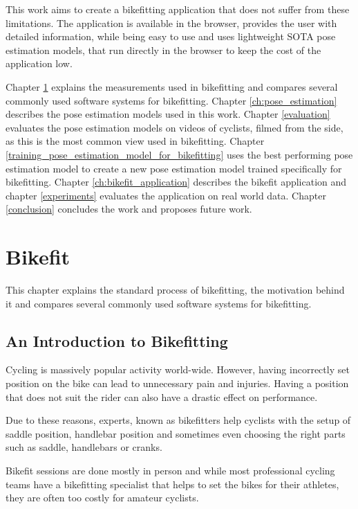 This work aims to create a bikefitting application that does not suffer from these limitations. The application is available in the browser, provides the user with detailed information, while being easy to use and uses lightweight SOTA pose estimation models, that run directly in the browser to keep the cost of the application low.

Chapter \ref{bikefit} explains the measurements used in bikefitting and compares several commonly used software systems for bikefitting. Chapter \ref{ch:pose_estimation} describes the pose estimation models used in this work. Chapter \ref{evaluation} evaluates the pose estimation models on videos of cyclists, filmed from the side, as this is the most common view used in bikefitting. Chapter \ref{training_pose_estimation_model_for_bikefitting} uses the best performing pose estimation model to create a new pose estimation model trained specifically for bikefitting. Chapter \ref{ch:bikefit_application} describes the bikefit application and chapter \ref{experiments} evaluates the application on real world data. Chapter \ref{conclusion} concludes the work and proposes future work.


\chapter{Bikefit}
\label{bikefit}
This chapter explains the standard process of bikefitting, the motivation behind it and compares several commonly used software systems for bikefitting.

\section{An Introduction to Bikefitting}
Cycling is massively popular activity world-wide. However, having incorrectly set position on the bike can lead to unnecessary pain and injuries. Having a position that does not suit the rider can also have a drastic effect on performance.

Due to these reasons, experts, known as bikefitters help cyclists with the setup of saddle position, handlebar position and sometimes even choosing the right parts such as saddle, handlebars or cranks.

Bikefit sessions are done mostly in person and while most professional cycling teams have a bikefitting specialist that helps to set the bikes for their athletes, they are often too costly for amateur cyclists.


